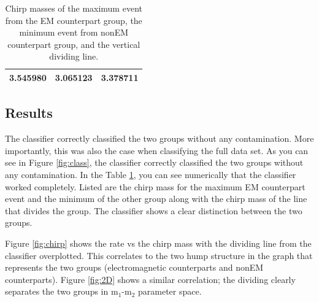 \begin{table}[ht]
\caption{Chirp masses of the maximum event from the EM counterpart group, the minimum event from nonEM counterpart group, and the vertical dividing line.}
\centering
\begin{tabular}{c c c}

\hline\hline
3.545980 & 3.065123 & 3.378711\\
\hline\hline
\end{tabular}
\label{tab:mass}
\end{table}

\subsection{Results}
The classifier correctly classified the two groups without any contamination. More importantly, this was also the case when classifying the full data set. As you can see in Figure \ref{fig:class}, the classifier correctly classified the two groups without any contamination. In the Table \ref{tab:mass}, you can see numerically that the classifier worked completely. Listed are the chirp mass for the maximum EM counterpart event and the minimum of the other group along with the chirp mass of the line that divides the group. The classifier shows a clear distinction between the two groups.



Figure \ref{fig:chirp} shows the rate vs the chirp mass with the dividing line from the classifier overplotted. This correlates to the two hump structure in the graph that represents the two groups (electromagnetic counterparts and nonEM counterparts). Figure \ref{fig:2D} shows a similar correlation; the dividing clearly separates the two groups in  m$_{1}$-m$_{2}$ parameter space.